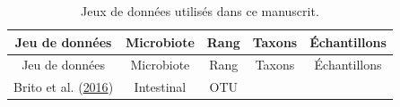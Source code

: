 \documentclass[12pt,a4paper]{reedthesis}
\theoremstyle{definition}
\theoremstyle{definition}
\theoremstyle{definition}
\theoremstyle{remark}
\begin{document}
\newpage
\begin{longtable}[]{@{}ccccc@{}}
\caption{\label{tab:datasets} Jeux de données utilisés dans ce manuscrit.}\tabularnewline
\toprule
\begin{minipage}[b]{0.29\columnwidth}\centering
Jeu de données\strut
\end{minipage} & \begin{minipage}[b]{0.18\columnwidth}\centering
Microbiote\strut
\end{minipage} & \begin{minipage}[b]{0.10\columnwidth}\centering
Rang\strut
\end{minipage} & \begin{minipage}[b]{0.12\columnwidth}\centering
Taxons\strut
\end{minipage} & \begin{minipage}[b]{0.16\columnwidth}\centering
Échantillons\strut
\end{minipage}\tabularnewline
\midrule
\endfirsthead
\toprule
\begin{minipage}[b]{0.29\columnwidth}\centering
Jeu de données\strut
\end{minipage} & \begin{minipage}[b]{0.18\columnwidth}\centering
Microbiote\strut
\end{minipage} & \begin{minipage}[b]{0.10\columnwidth}\centering
Rang\strut
\end{minipage} & \begin{minipage}[b]{0.12\columnwidth}\centering
Taxons\strut
\end{minipage} & \begin{minipage}[b]{0.16\columnwidth}\centering
Échantillons\strut
\end{minipage}\tabularnewline
\midrule
\endhead
\begin{minipage}[t]{0.29\columnwidth}\centering
Brito et al. (\protect\hyperlink{ref-brito2016mobile}{2016})\strut
\end{minipage} & \begin{minipage}[t]{0.18\columnwidth}\centering
Intestinal\strut
\end{minipage} & \begin{minipage}[t]{0.10\columnwidth}\centering
OTU\strut
\end{minipage} & \begin{minipage}[t]{0.12\columnwidth}\centering
77\strut
\end{minipage} & \begin{minipage}[t]{0.16\columnwidth}\centering

\end{minipage}
\end{longtable}
\end{document}
